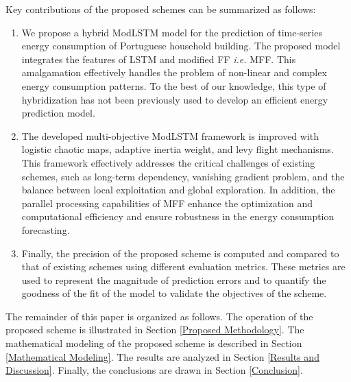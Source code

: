\documentclass[journal]{IEEEtran}
\begin{document}
 Key contributions of the proposed schemes can be summarized as follows:
 \begin{enumerate}
     
   

\item We propose a hybrid ModLSTM model for the prediction of time-series energy consumption of Portuguese household building. The proposed model integrates the features of LSTM and modified FF \textit{i.e.} MFF. This amalgamation effectively handles the problem of non-linear and complex energy consumption patterns. To the best of our knowledge, this type of hybridization has not been previously used to develop an efficient energy prediction model.



   
\item The developed multi-objective ModLSTM framework is improved with logistic chaotic maps, adaptive inertia weight, and levy flight mechanisms. This framework effectively addresses the critical challenges of existing schemes, such as long-term dependency, vanishing gradient problem, and the balance between local exploitation and global exploration. In addition, the parallel processing capabilities of MFF enhance the optimization and computational efficiency and ensure robustness in the energy consumption forecasting.




 
   
 \item Finally, the precision of the proposed scheme is computed and compared to that of existing schemes using different evaluation metrics. These metrics are used to represent the magnitude of prediction errors and to quantify the goodness of the fit of the model to validate the objectives of the scheme. 

 

 \end{enumerate}
  
 
 The remainder of this paper is organized as follows. The operation of the proposed scheme is illustrated in Section \ref{Proposed Methodology}. The mathematical modeling of the proposed scheme is described in Section \ref{Mathematical Modeling}. The results are analyzed in Section \ref{Results and Discussion}. Finally, the conclusions are drawn in Section \ref{Conclusion}. 
\end{document}
